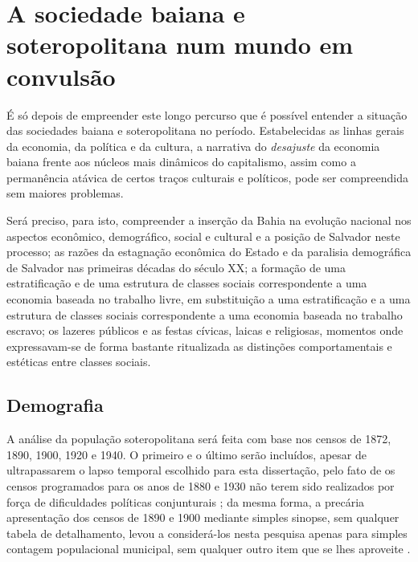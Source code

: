 \section{A sociedade baiana e soteropolitana num mundo em convulsão}\label{sec:sobasotconv}

É só depois de empreender este longo percurso que é possível entender a situação das sociedades baiana e soteropolitana no período. Estabelecidas as linhas gerais da economia, da política e da cultura, a narrativa do \textit{desajuste} da economia baiana frente aos núcleos mais dinâmicos do capitalismo, assim como a permanência atávica de certos traços culturais e políticos, pode ser compreendida sem maiores problemas.

Será preciso, para isto, compreender a inserção da Bahia na evolução nacional nos aspectos econômico, demográfico, social e cultural e a posição de Salvador neste processo; as razões da estagnação econômica do Estado e da paralisia demográfica de Salvador nas primeiras décadas do século XX; a formação de uma estratificação e de uma estrutura de classes sociais correspondente a uma economia baseada no trabalho livre, em substituição a uma estratificação e a uma estrutura de classes sociais correspondente a uma economia baseada no trabalho escravo; os lazeres públicos e as festas cívicas, laicas e religiosas, momentos onde expressavam-se de forma bastante ritualizada as distinções comportamentais e estéticas entre classes sociais.

\subsection{Demografia}\label{subsec:demogbasa}

A análise da população soteropolitana será feita com base nos censos de 1872, 1890, 1900, 1920 e 1940. O primeiro e o último serão incluídos, apesar de ultrapassarem o lapso temporal escolhido para esta dissertação, pelo fato de os censos programados para os anos de 1880 e 1930 não terem sido realizados por força de dificuldades políticas conjunturais \cite{oliveirasimoes_censos_2005}; da mesma forma, a precária apresentação dos censos de 1890 e 1900 mediante simples sinopse, sem qualquer tabela de detalhamento, levou a considerá-los nesta pesquisa apenas para simples contagem populacional municipal, sem qualquer outro item que se lhes aproveite \cite{reisetal_areascensos_2011}. 


